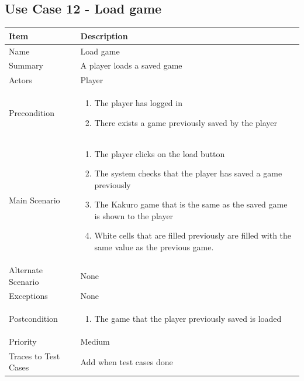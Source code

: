 \documentclass[12pt]{article}
\begin{document}
\newpage


\subsection{Use Case 12 - Load game}

\begin{center}
\setlength{\tabcolsep}{18pt}
\renewcommand{\arraystretch}{1.3}
\begin{tabular}{ |p{3.4cm}|p{10cm}| }
    \hline
   \textbf{Item} & \textbf{Description} \\
    \hline
    Name & Load game \\
    \hline
    Summary & A player loads a saved game \\
    \hline
    Actors & Player \\
    \hline
    Precondition & 
    \vspace*{-0.1in}
    \begin{enumerate}[leftmargin=0.2in]
        \item The player has logged in
        \item There exists a game previously saved by the player
    \end{enumerate}  \\
    \hline
    Main Scenario & 
    \vspace*{-0.1in}
    \begin{enumerate}[leftmargin=0.2in]
    \item The player clicks on the load button 
    \item The system checks that the player has saved a game previously
    \item The Kakuro game that is the same as the saved game is shown to the player
    \item White cells that are filled previously are filled with the same value as the previous game. 
    \end{enumerate}  \\
     \hline
    Alternate Scenario & None  \\
    \hline
    Exceptions & None \\
    \hline
    Postcondition & 
    \vspace*{-0.1in}
    \begin{enumerate}[leftmargin=0.2in]
        \item The game that the player previously saved is loaded
    \end{enumerate} \\
    \hline
    Priority & Medium \\
    \hline
    \small{Traces to Test Cases} & Add when test cases done  \\
    \hline
\end{tabular}
\end{center}
\end{document}

